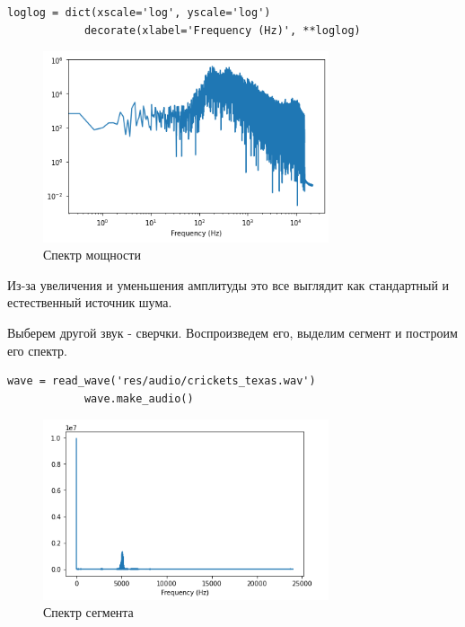 \documentclass[a4paper,12pt]{article}
\begin{document}
\begin{enumerate}
\begin{lstlisting}[caption=Спектр мощности]
			loglog = dict(xscale='log', yscale='log')
			decorate(xlabel='Frequency (Hz)', **loglog)
		\end{lstlisting}
		\begin{figure}[H]
			\centering
			\includegraphics[width=0.75\textwidth]{1_2.png}
			\caption{Спектр мощности}
			\label{fig:1.2}
		\end{figure}
		
		Из-за увеличения и уменьшения амплитуды это все выглядит как стандартный и естественный источник шума.
		
		Выберем другой звук - сверчки. Воспроизведем его, выделим сегмент и построим его спектр. 
		
		\begin{lstlisting}[caption=Работа со звуком сверчков]
			wave = read_wave('res/audio/crickets_texas.wav')
			wave.make_audio()
		\end{lstlisting}
		\begin{figure}[H]
			\centering
			\includegraphics[width=0.75\textwidth]{1_3.png}
			\caption{Спектр сегмента}
			\label{fig:1.3}
		\end{figure}
		

\end{enumerate}
\end{document}
